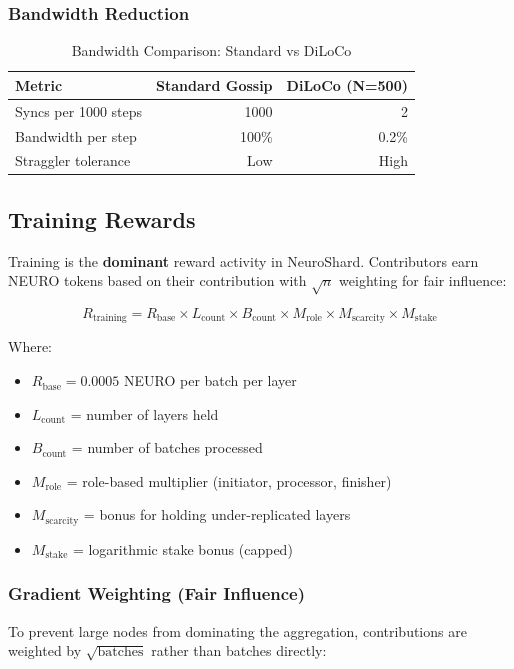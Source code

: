 \documentclass[11pt,a4paper]{article}
\begin{document}
\subsubsection{Bandwidth Reduction}
\begin{table}[H]
\centering
\caption{Bandwidth Comparison: Standard vs DiLoCo}
\begin{tabular}{@{}lrr@{}}
\toprule
\textbf{Metric} & \textbf{Standard Gossip} & \textbf{DiLoCo (N=500)} \\
\midrule
Syncs per 1000 steps & 1000 & 2 \\
Bandwidth per step & 100\% & 0.2\% \\
Straggler tolerance & Low & High \\
\bottomrule
\end{tabular}
\end{table}

\subsection{Training Rewards}

Training is the \textbf{dominant} reward activity in NeuroShard. Contributors earn NEURO tokens based on their contribution with $\sqrt{n}$ weighting for fair influence:

\begin{equation}
R_{\text{training}} = R_{\text{base}} \times L_{\text{count}} \times B_{\text{count}} \times M_{\text{role}} \times M_{\text{scarcity}} \times M_{\text{stake}}
\end{equation}

Where:
\begin{itemize}
    \item $R_{\text{base}} = 0.0005$ NEURO per batch per layer
    \item $L_{\text{count}}$ = number of layers held
    \item $B_{\text{count}}$ = number of batches processed
    \item $M_{\text{role}}$ = role-based multiplier (initiator, processor, finisher)
    \item $M_{\text{scarcity}}$ = bonus for holding under-replicated layers
    \item $M_{\text{stake}}$ = logarithmic stake bonus (capped)
\end{itemize}

\subsubsection{Gradient Weighting (Fair Influence)}
To prevent large nodes from dominating the aggregation, contributions are weighted by $\sqrt{\text{batches}}$ rather than batches directly:
\end{document}
